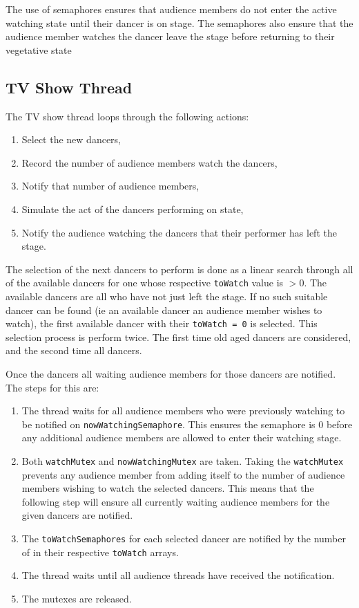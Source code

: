 \documentclass[12pt,a4paper]{scrartcl}
\begin{document}
The use of semaphores ensures that audience members do not enter the active watching state until their dancer is on stage.
The semaphores also ensure that the audience member watches the dancer leave the stage before returning to their vegetative state

\subsection{TV Show Thread}
The TV show thread loops through the following actions:
\begin{enumerate}
    \item Select the new dancers,
    \item Record the number of audience members watch the dancers,
    \item Notify that number of audience members,
    \item Simulate the act of the dancers performing on state,
    \item Notify the audience watching the dancers that their performer has left the stage.
\end{enumerate}

The selection of the next dancers to perform is done as a linear search through all of the available dancers for one whose respective \texttt{toWatch} value is $>0$.
The available dancers are all who have not just left the stage.
If no such suitable dancer can be found (ie an available dancer an audience member wishes to watch), the first available dancer with their \texttt{toWatch = 0} is selected.
This selection process is perform twice.
The first time old aged dancers are considered, and the second time all dancers.

Once the dancers all waiting audience members for those dancers are notified.
The steps for this are:
\begin{enumerate}
    \item The thread waits for all audience members who were previously watching to be notified on \texttt{nowWatchingSemaphore}.
          This ensures the semaphore is 0 before any additional audience members are allowed to enter their watching stage.
    \item Both \texttt{watchMutex} and \texttt{nowWatchingMutex} are taken.
          Taking the \texttt{watchMutex} prevents any audience member from adding itself to the number of audience members wishing to watch the selected dancers.
          This means that the following step will ensure all currently waiting audience members for the given dancers are notified.
    \item The \texttt{toWatchSemaphores} for each selected dancer are notified by the number of in their respective \texttt{toWatch} arrays.
    \item The thread waits until all audience threads have received the notification.
    \item The mutexes are released.
\end{enumerate}
\end{document}
